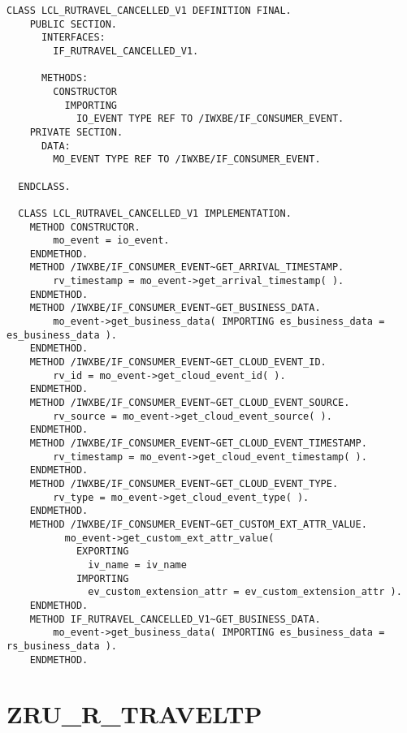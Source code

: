 \begin{Verbatim}[breaklines=true]
    CLASS LCL_RUTRAVEL_CANCELLED_V1 DEFINITION FINAL.
    PUBLIC SECTION.
      INTERFACES:
        IF_RUTRAVEL_CANCELLED_V1.
  
      METHODS:
        CONSTRUCTOR
          IMPORTING
            IO_EVENT TYPE REF TO /IWXBE/IF_CONSUMER_EVENT.
    PRIVATE SECTION.
      DATA:
        MO_EVENT TYPE REF TO /IWXBE/IF_CONSUMER_EVENT.
  
  ENDCLASS.
  
  CLASS LCL_RUTRAVEL_CANCELLED_V1 IMPLEMENTATION.
    METHOD CONSTRUCTOR.
        mo_event = io_event.
    ENDMETHOD.
    METHOD /IWXBE/IF_CONSUMER_EVENT~GET_ARRIVAL_TIMESTAMP.
        rv_timestamp = mo_event->get_arrival_timestamp( ).
    ENDMETHOD.
    METHOD /IWXBE/IF_CONSUMER_EVENT~GET_BUSINESS_DATA.
        mo_event->get_business_data( IMPORTING es_business_data = es_business_data ).
    ENDMETHOD.
    METHOD /IWXBE/IF_CONSUMER_EVENT~GET_CLOUD_EVENT_ID.
        rv_id = mo_event->get_cloud_event_id( ).
    ENDMETHOD.
    METHOD /IWXBE/IF_CONSUMER_EVENT~GET_CLOUD_EVENT_SOURCE.
        rv_source = mo_event->get_cloud_event_source( ).
    ENDMETHOD.
    METHOD /IWXBE/IF_CONSUMER_EVENT~GET_CLOUD_EVENT_TIMESTAMP.
        rv_timestamp = mo_event->get_cloud_event_timestamp( ).
    ENDMETHOD.
    METHOD /IWXBE/IF_CONSUMER_EVENT~GET_CLOUD_EVENT_TYPE.
        rv_type = mo_event->get_cloud_event_type( ).
    ENDMETHOD.
    METHOD /IWXBE/IF_CONSUMER_EVENT~GET_CUSTOM_EXT_ATTR_VALUE.
          mo_event->get_custom_ext_attr_value(
            EXPORTING
              iv_name = iv_name
            IMPORTING
              ev_custom_extension_attr = ev_custom_extension_attr ).
    ENDMETHOD.
    METHOD IF_RUTRAVEL_CANCELLED_V1~GET_BUSINESS_DATA.
        mo_event->get_business_data( IMPORTING es_business_data = rs_business_data ).
    ENDMETHOD.
\end{Verbatim}

\section*{ ZRU\_R\_TRAVELTP} 

